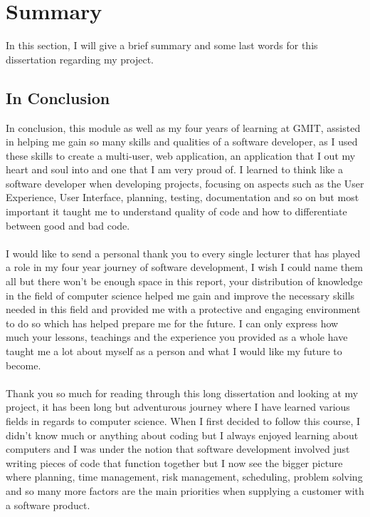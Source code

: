 \section{Summary}

In this section, I will give a brief summary and some last words for this dissertation regarding my project.

\subsection{In Conclusion}

In conclusion, this module as well as my four years of learning at GMIT, assisted in helping me gain so many skills and qualities of a software developer, as I used these skills to create a multi-user, web application, an application that I out my heart and soul into and one that I am very proud of. I learned to think like a software developer when developing projects, focusing on aspects such as the User Experience, User Interface, planning, testing, documentation and so on but most important it taught me to understand quality of code and how to differentiate between good and bad code. \\ \\ 
I would like to send a personal thank you to every single lecturer that has played a role in my four year journey of software development, I wish I could name them all but there won't be enough space in this report, your distribution of knowledge in the field of computer science helped me gain and improve the necessary skills needed in this field and provided me with a protective and engaging environment to do so which has helped prepare me for the future. I can only express how much your lessons, teachings and the experience you provided as a whole have taught me a lot about myself as a person and what I would like my future to become. \\ \\ 
Thank you so much for reading through this long dissertation and looking at my project, it has been long but adventurous journey where I have learned various fields in regards to computer science. When I first decided to follow this course, I didn't know much or anything about coding but I always enjoyed learning about computers and I was under the notion that software development involved just writing pieces of code that function together but I now see the bigger picture where planning, time management, risk management, scheduling, problem solving and so many more factors are the main priorities when supplying a customer with a software product.\\ \\ 
